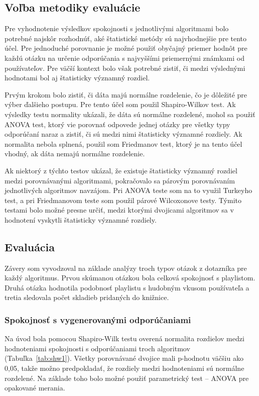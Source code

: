 \subsection{Voľba metodiky evaluácie}
Pre vyhodnotenie výsledkov spokojnosti s jednotlivými algoritmami bolo potrebné najskôr rozhodnúť, aké štatistické metódy sú najvhodnejšie pre tento účel. Pre jednoduché porovnanie je možné použiť obyčajný priemer hodnôt pre každú otázku na určenie odporúčania s najvyššími priemernými známkami od používateľov. Pre väčší kontext bolo však potrebné zistiť, či medzi výslednými hodnotami bol aj štatisticky významný rozdiel. 

Prvým krokom bolo zistiť, či dáta majú normálne rozdelenie, čo je dôležité pre výber ďalšieho postupu. Pre tento účel som použil Shapiro-Wilkov test. Ak výsledky testu normality ukázali, že dáta sú normálne rozdelené, mohol sa použiť ANOVA test, ktorý vie porovnať odpovede jednej otázky pre všetky typy odporúčaní naraz a zistiť, či sú medzi nimi štatisticky významné rozdiely. Ak normalita nebola splnená, použil som Friedmanov test, ktorý je na tento účel vhodný, ak dáta nemajú normálne rozdelenie.

Ak niektorý z týchto testov ukázal, že existuje štatisticky významný rozdiel medzi porovnávanými algoritmami, pokračovalo sa párovým porovnávaním jednotlivých algoritmov navzájom. Pri ANOVA teste som na to využil Turkeyho test, a pri Friedmanovom teste som použil párové Wilcoxonove testy. Týmito testami bolo možné presne určiť, medzi ktorými dvojicami algoritmov sa v hodnotení vyskytli štatisticky významné rozdiely.


\subsection{Evaluácia}
Závery som vyvodzoval na základe analýzy troch typov otázok z dotazníka pre každý algoritmus. Prvou skúmanou otázkou bola celková spokojnosť s playlistom. Druhá otázka hodnotila podobnosť playlistu s hudobným vkusom používateľa a tretia sledovala počet skladieb pridaných do knižnice.

\subsubsection{Spokojnosť s vygenerovanými odporúčaniami}

Na úvod bola pomocou Shapiro-Wilk testu overená normalita rozdielov medzi hodnoteniami spokojnosti s odporúčaniami troch algoritmov (Tabuľka~\ref{tab:shw1}). Všetky porovnávané dvojice mali p-hodnotu väčšiu ako 0,05, takže možno predpokladať, že rozdiely medzi hodnoteniami sú normálne rozdelené. Na základe toho bolo možné použiť parametrický test – ANOVA pre opakované merania.

